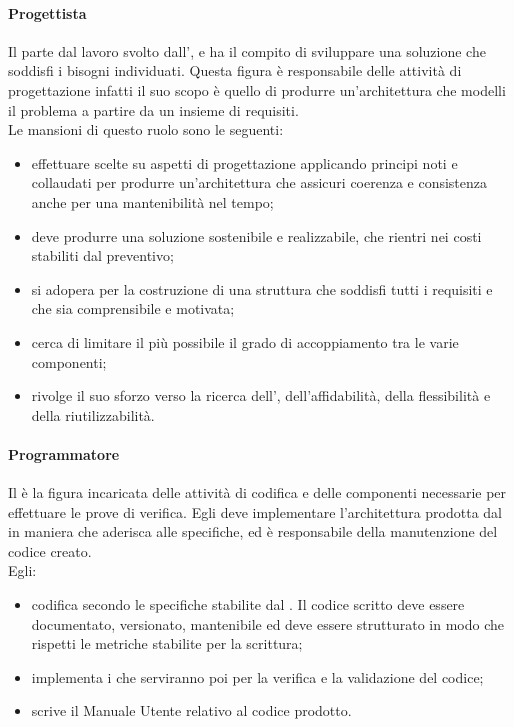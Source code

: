             \paragraph{Progettista }
                Il  parte dal lavoro svolto dall’, e ha il compito di sviluppare una soluzione che soddisfi i bisogni individuati. Questa figura è responsabile delle attività di progettazione infatti il suo scopo è quello di produrre un’architettura che modelli il problema a partire da un insieme di requisiti. \\
                Le mansioni di questo ruolo sono le seguenti:\\
                \begin{itemize}
                    \item effettuare scelte su aspetti di progettazione applicando principi noti e collaudati per produrre un’architettura che assicuri coerenza e consistenza anche per una mantenibilità nel tempo;
                    \item deve produrre una soluzione sostenibile e realizzabile, che rientri nei costi stabiliti dal preventivo;
                    \item si adopera per la costruzione di una struttura che soddisfi tutti i requisiti e che sia comprensibile e motivata;
                    \item cerca di limitare il più possibile il grado di accoppiamento tra le varie componenti;
                    \item rivolge il suo sforzo verso la ricerca dell’, dell’affidabilità, della flessibilità e della riutilizzabilità.
                \end{itemize}
            \paragraph{Programmatore }
                Il  è la figura incaricata delle attività di codifica e delle componenti necessarie per effettuare le prove di verifica. Egli deve implementare l’architettura prodotta dal  in maniera che aderisca alle specifiche, ed è responsabile della manutenzione del codice creato. \\
                Egli:
                \begin{itemize}
                    \item codifica secondo le specifiche stabilite dal . Il codice scritto deve essere documentato, versionato, mantenibile ed deve essere strutturato in modo che rispetti le metriche stabilite per la scrittura;
                    \item implementa i  che serviranno poi per la verifica e la validazione del codice;
                    \item scrive il Manuale Utente relativo al codice prodotto.
                \end{itemize}
